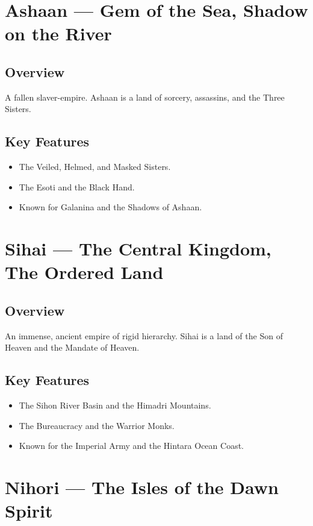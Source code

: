 \section{Ashaan — Gem of the Sea, Shadow on the River}
\label{sec:lore-ashaan}

\subsection*{Overview}
A fallen slaver-empire. Ashaan is a land of sorcery, assassins, and the Three Sisters.

\subsection*{Key Features}
\begin{itemize}[leftmargin=*]
    \item The Veiled, Helmed, and Masked Sisters.
    \item The Esoti and the Black Hand.
    \item Known for Galanina and the Shadows of Ashaan.
\end{itemize}

\section{Sihai — The Central Kingdom, The Ordered Land}
\label{sec:lore-sihai}

\subsection*{Overview}
An immense, ancient empire of rigid hierarchy. Sihai is a land of the Son of Heaven and the Mandate of Heaven.

\subsection*{Key Features}
\begin{itemize}[leftmargin=*]
    \item The Sihon River Basin and the Himadri Mountains.
    \item The Bureaucracy and the Warrior Monks.
    \item Known for the Imperial Army and the Hintara Ocean Coast.
\end{itemize}

\section{Nihori — The Isles of the Dawn Spirit}
\label{sec:lore-nihori}

